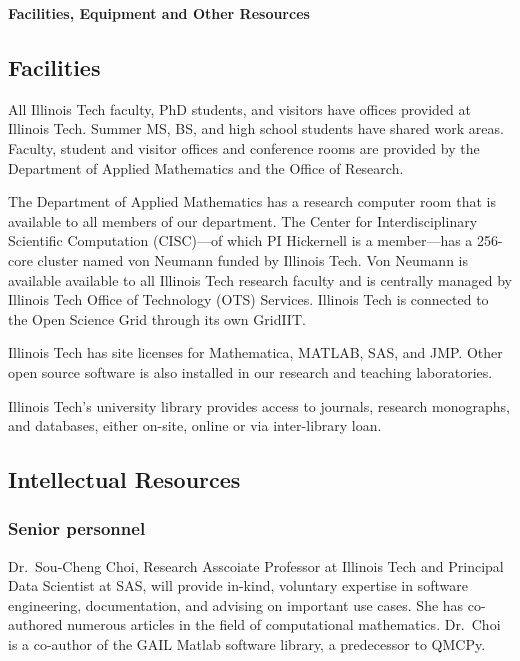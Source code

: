 \documentclass[11pt]{NSFamsart}
\begin{document}

\centerline{\textbf{\Large Facilities, Equipment and Other Resources}}

\bigskip

\subsection*{Facilities}
All Illinois Tech faculty, PhD students, and visitors have offices provided at Illinois Tech.  Summer 
MS, BS, and high school students have shared work areas.  Faculty, student and visitor 
offices and conference rooms are provided by the Department of Applied Mathematics and the Office of Research.

The Department of Applied Mathematics has a research computer room that is available to all 
members of our department.  The Center for Interdisciplinary Scientific Computation (CISC)---of which PI Hickernell is a member---has a 256-core cluster named von Neumann funded by Illinois Tech.  Von Neumann is 
available available to all Illinois Tech research faculty and is
centrally managed by Illinois Tech Office of Technology (OTS) Services.  Illinois Tech is connected 
to the Open Science Grid through its own GridIIT.  

Illinois Tech has site licenses for Mathematica, MATLAB, SAS, and JMP.  Other open source 
software is also installed in our research and teaching laboratories.

Illinois Tech's university library provides access to journals, research monographs, and 
databases, either on-site, online or via inter-library loan.

\subsection*{Intellectual Resources}
\phantom{a}

\subsubsection*{Senior personnel}  
Dr.\ Sou-Cheng Choi, Research Asscoiate Professor at Illinois Tech and Principal Data Scientist at SAS, will provide in-kind, voluntary expertise in software engineering, documentation, and advising on important use cases.  She has co-authored numerous articles in the field of computational mathematics.  Dr.\ Choi is a co-author of the GAIL Matlab software library, a predecessor to QMCPy.
\end{document}
